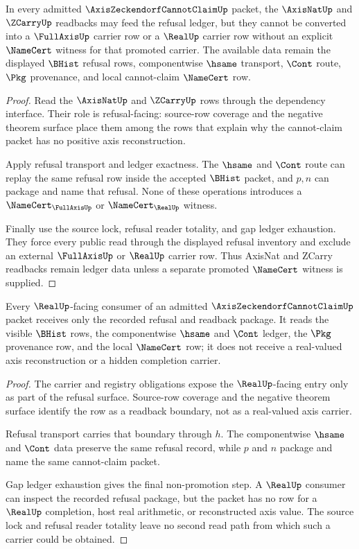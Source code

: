 \begin{theorem}
\label{thm:axis-zeckendorf-cannot-claim-axisnat-zcarry-refusal}
In every admitted $\AxisZeckendorfCannotClaimUp$ packet, the $\AxisNatUp$ and $\ZCarryUp$ readbacks may feed the refusal ledger, but they cannot be converted into a $\FullAxisUp$ carrier row or a $\RealUp$ carrier row without an explicit $\NameCert$ witness for that promoted carrier. The available data remain the displayed $\BHist$ refusal rows, componentwise $\hsame$ transport, $\Cont$ route, $\Pkg$ provenance, and local cannot-claim $\NameCert$ row.
\end{theorem}
\begin{proof}
Read the $\AxisNatUp$ and $\ZCarryUp$ rows through the dependency interface. Their role is refusal-facing: source-row coverage and the negative theorem surface place them among the rows that explain why the cannot-claim packet has no positive axis reconstruction.

Apply refusal transport and ledger exactness. The $\hsame$ and $\Cont$ route can replay the same refusal row inside the accepted $\BHist$ packet, and $p,n$ can package and name that refusal. None of these operations introduces a $\NameCert_{\FullAxisUp}$ or $\NameCert_{\RealUp}$ witness.

Finally use the source lock, refusal reader totality, and gap ledger exhaustion. They force every public read through the displayed refusal inventory and exclude an external $\FullAxisUp$ or $\RealUp$ carrier row. Thus AxisNat and ZCarry readbacks remain ledger data unless a separate promoted $\NameCert$ witness is supplied.
\end{proof}

\begin{theorem}
\label{thm:axis-zeckendorf-cannot-claim-real-readback-nonpromotion}
Every $\RealUp$-facing consumer of an admitted $\AxisZeckendorfCannotClaimUp$ packet receives only the recorded refusal and readback package. It reads the visible $\BHist$ rows, the componentwise $\hsame$ and $\Cont$ ledger, the $\Pkg$ provenance row, and the local $\NameCert$ row; it does not receive a real-valued axis reconstruction or a hidden completion carrier.
\end{theorem}
\begin{proof}
The carrier and registry obligations expose the $\RealUp$-facing entry only as part of the refusal surface. Source-row coverage and the negative theorem surface identify the row as a readback boundary, not as a real-valued axis carrier.

Refusal transport carries that boundary through $h$. The componentwise $\hsame$ and $\Cont$ data preserve the same refusal record, while $p$ and $n$ package and name the same cannot-claim packet.

Gap ledger exhaustion gives the final non-promotion step. A $\RealUp$ consumer can inspect the recorded refusal package, but the packet has no row for a $\RealUp$ completion, host real arithmetic, or reconstructed axis value. The source lock and refusal reader totality leave no second read path from which such a carrier could be obtained.
\end{proof}

